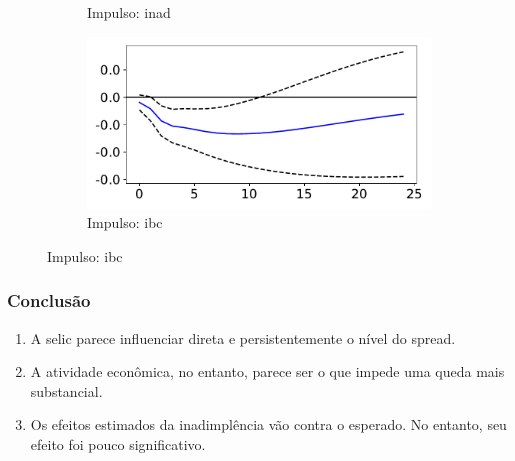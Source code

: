\documentclass{beamer}
\begin{document}
\begin{frame}
\begin{figure}[!hbt]
\begin{subfigure}[t]{.4\linewidth}
            \caption{Impulso: inad}
        \end{subfigure}
        \begin{subfigure}[t]{.4\linewidth}
            \includegraphics[width = \textwidth, scale=1]{irf/orth_spread_ibc.pdf}
            \caption{Impulso: ibc}
        \end{subfigure}
    \end{figure}
\end{frame}

\begin{frame}
    \frametitle{Conclusão}
    \begin{enumerate}
        \item A selic parece influenciar direta e persistentemente o nível do spread.
        \item A atividade econômica, no entanto, parece ser o que impede uma queda mais substancial.
        \item Os efeitos estimados da inadimplência vão contra o esperado. No entanto, seu efeito foi pouco significativo.
    \end{enumerate}
\end{frame}
\end{document}
